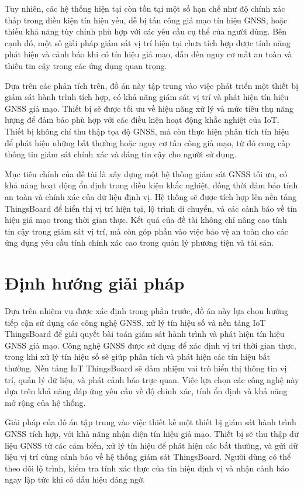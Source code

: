 \documentclass[../DoAn.tex]{subfiles}
\begin{document}
Tuy nhiên, các hệ thống hiện tại còn tồn tại một số hạn chế như độ chính xác thấp trong điều kiện tín hiệu yếu, dễ bị tấn công giả mạo tín hiệu GNSS, hoặc thiếu khả năng tùy chỉnh phù hợp với các yêu cầu cụ thể của người dùng. Bên cạnh đó, một số giải pháp giám sát vị trí hiện tại chưa tích hợp được tính năng phát hiện và cảnh báo khi có tín hiệu giả mạo, dẫn đến nguy cơ mất an toàn và thiếu tin cậy trong các ứng dụng quan trọng.

Dựa trên các phân tích trên, đồ án này tập trung vào việc phát triển một thiết bị giám sát hành trình tích hợp, có khả năng giám sát vị trí và phát hiện tín hiệu GNSS giả mạo. Thiết bị sẽ được tối ưu về hiệu năng xử lý và mức tiêu thụ năng lượng để đảm bảo phù hợp với các điều kiện hoạt động khắc nghiệt của IoT. Thiết bị không chỉ thu thập tọa độ GNSS, mà còn thực hiện phân tích tín hiệu để phát hiện những bất thường hoặc nguy cơ tấn công giả mạo, từ đó cung cấp thông tin giám sát chính xác và đáng tin cậy cho người sử dụng.

Mục tiêu chính của đề tài là xây dựng một hệ thống giám sát GNSS tối ưu, có khả năng hoạt động ổn định trong điều kiện khắc nghiệt, đồng thời đảm bảo tính an toàn và chính xác của dữ liệu định vị. Hệ thống sẽ được tích hợp lên nền tảng ThingsBoard để hiển thị vị trí hiện tại, lộ trình di chuyển, và các cảnh báo về tín hiệu giả mạo trong thời gian thực. Kết quả của đề tài không chỉ nâng cao tính tin cậy trong giám sát vị trí, mà còn góp phần vào việc bảo vệ an toàn cho các ứng dụng yêu cầu tính chính xác cao trong quản lý phương tiện và tài sản.

\section{Định hướng giải pháp}
\label{section:1.3}
Dựa trên nhiệm vụ được xác định trong phần trước, đồ án này lựa chọn hướng tiếp cận sử dụng các công nghệ GNSS, xử lý tín hiệu số và nền tảng IoT ThingsBoard để giải quyết bài toán giám sát hành trình và phát hiện tín hiệu GNSS giả mạo. Công nghệ GNSS được sử dụng để xác định vị trí thời gian thực, trong khi xử lý tín hiệu số sẽ giúp phân tích và phát hiện các tín hiệu bất thường. Nền tảng IoT ThingsBoard sẽ đảm nhiệm vai trò hiển thị thông tin vị trí, quản lý dữ liệu, và phát cảnh báo trực quan. Việc lựa chọn các công nghệ này dựa trên khả năng đáp ứng yêu cầu về độ chính xác, tính ổn định và khả năng mở rộng của hệ thống.

Giải pháp của đồ án tập trung vào việc thiết kế một thiết bị giám sát hành trình GNSS tích hợp, với khả năng nhận diện tín hiệu giả mạo. Thiết bị sẽ thu thập dữ liệu GNSS từ các cảm biến, xử lý tín hiệu để phát hiện các bất thường, và gửi dữ liệu vị trí cùng cảnh báo về hệ thống giám sát ThingsBoard. Người dùng có thể theo dõi lộ trình, kiểm tra tính xác thực của tín hiệu định vị và nhận cảnh báo ngay lập tức khi có dấu hiệu đáng ngờ.
\end{document}
